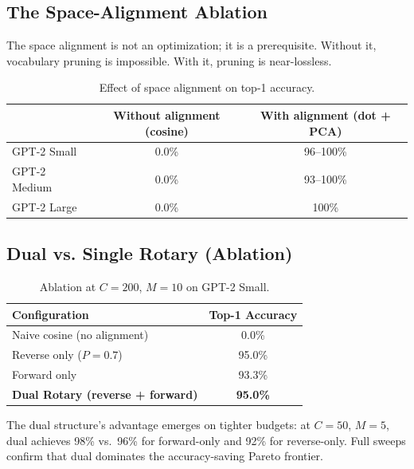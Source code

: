 \documentclass[11pt]{article}
\begin{document}
\subsection{The Space-Alignment Ablation}

The space alignment is not an optimization; it is a prerequisite. Without it, vocabulary pruning is impossible. With it, pruning is near-lossless.

\begin{table}[h]
\centering
\caption{Effect of space alignment on top-1 accuracy.}
\label{tab:alignment}
\begin{tabular}{lcc}
\toprule
                    & Without alignment (cosine) & With alignment (dot + PCA) \\
\midrule
GPT-2 Small         & 0.0\%                      & 96--100\%                  \\
GPT-2 Medium        & 0.0\%                      & 93--100\%                  \\
GPT-2 Large         & 0.0\%                      & 100\%                      \\
\bottomrule
\end{tabular}
\end{table}

\subsection{Dual vs. Single Rotary (Ablation)}\label{sec:ablation}

\begin{table}[h]
\centering
\caption{Ablation at $C = 200$, $M = 10$ on GPT-2 Small.}
\label{tab:dual_ablation}
\begin{tabular}{lc}
\toprule
Configuration                        & Top-1 Accuracy \\
\midrule
Naive cosine (no alignment)          & 0.0\%          \\
Reverse only ($P = 0.7$)             & 95.0\%         \\
Forward only                         & 93.3\%         \\
\textbf{Dual Rotary (reverse + forward)} & \textbf{95.0\%} \\
\bottomrule
\end{tabular}
\end{table}

The dual structure's advantage emerges on tighter budgets: at $C = 50$, $M = 5$, dual achieves 98\% vs.\ 96\% for forward-only and 92\% for reverse-only. Full sweeps confirm that dual dominates the accuracy-saving Pareto frontier.
\end{document}
